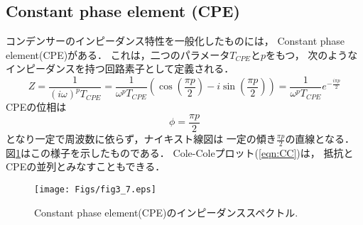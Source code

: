 \subsection{Constant phase element (CPE)}
コンデンサーのインピーダンス特性を一般化したものには，
Constant phase element(CPE)がある．
これは，二つのパラメータ$T_{CPE}$と$p$をもつ，
次のようなインピーダンスを持つ回路素子として定義される．
\begin{equation}
	Z=\frac{1}{(i\omega)^pT_{CPE}}
	=\frac{1}{\omega^p T_{CPE}} 
	\left( 
		\cos\left(\frac{\pi p}{2}\right) 
		-
		i
		\sin\left(\frac{\pi p}{2}\right) 
	\right)
	=\frac{1}{\omega^p T_{CPE}}e^{-\frac{i\pi p}{2}} 
	\label{eqn:Z_CPE}
\end{equation}
CPEの位相は
\begin{equation}
	\phi=\frac{\pi p}{2}
	\label{eqn:}
\end{equation}
となり一定で周波数に依らず，ナイキスト線図は
一定の傾き$\frac{\pi p}{2}$の直線となる．
図\ref{fig:fig3_7}はこの様子を示したものである．
Cole-Coleプロット(\ref{eqn:CC})は，
抵抗とCPEの並列とみなすこともできる．
\begin{figure}[h]
	\begin{center}
	\texttt{[image: Figs/fig3\_7.eps]} 
	\end{center}
	\caption{
		Constant phase element(CPE)のインピーダンススペクトル.
	} 
	\label{fig:fig3_7}
\end{figure}
